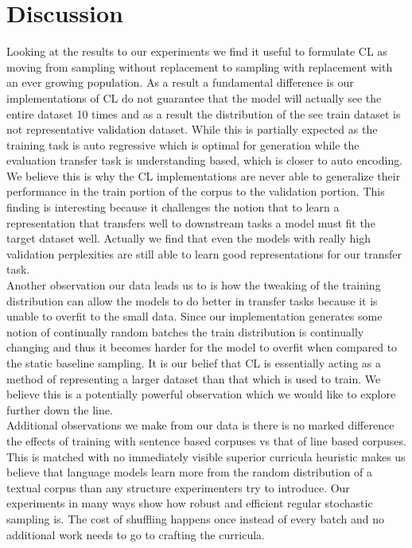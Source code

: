 \section{Discussion}
Looking at the results to our experiments we find it useful to formulate CL as moving from sampling without replacement to sampling with replacement with an ever growing population. As a result a fundamental difference is our implementations of CL do not guarantee that the model will actually see the entire dataset 10 times and as a result the distribution of the see train dataset is not representative validation dataset. While this is partially expected as the training task is auto regressive which is optimal for generation while the evaluation transfer task is understanding based, which is closer to auto encoding. We believe this is why the CL implementations are never able to generalize their performance in the train portion of the corpus to the validation portion. This finding is interesting because it challenges the notion that to learn a representation that transfers well to downstream tasks a model must fit the target dataset well. Actually we find that even the models with really high validation perplexities are still able to learn good representations for our transfer task. \\
Another observation our data leads us to is how the tweaking of the training distribution can allow the models to do better in transfer tasks because it is unable to overfit to the small data. Since our implementation generates some notion of continually random batches the train distribution is continually changing and thus it becomes harder for the model to overfit when compared to the static baseline sampling. It is our belief that CL is essentially acting as a method of representing a larger dataset than that which is used to train. We believe this is a potentially powerful observation which we would like to explore further down the line. \\
Additional observations we make from our data is there is no marked difference the effects of training with sentence based corpuses vs that of line based corpuses. This is matched with no immediately visible superior curricula heuristic makes us believe that language models learn more from the random distribution of a textual corpus than any structure experimenters try to introduce. Our experiments in many ways show how robust and efficient regular stochastic sampling is. The cost of shuffling happens once instead of every batch and no additional work needs to go to crafting the curricula.\\
